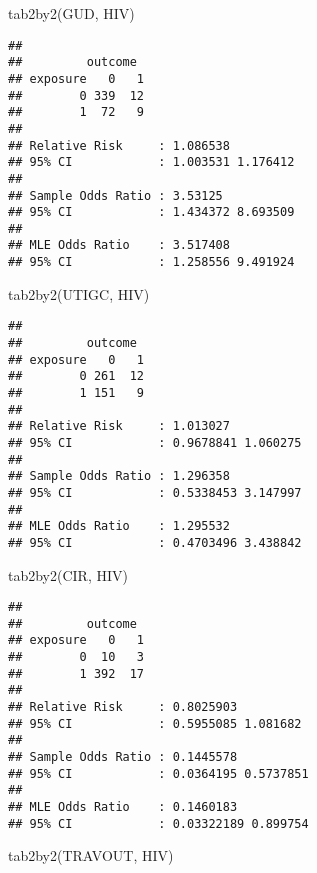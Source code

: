 \documentclass[
  12pt,
  a4paper]{book}
\newenvironment{Shaded}{\begin{snugshade}}{\end{snugshade}}
\newcommand{\FunctionTok}[1]{\textcolor[rgb]{0.00,0.00,0.00}{#1}}
\newcommand{\NormalTok}[1]{#1}
\begin{document}
\newpage

\begin{Shaded}
\begin{Highlighting}[]
\FunctionTok{tab2by2}\NormalTok{(GUD, HIV)}
\end{Highlighting}
\end{Shaded}

\begin{verbatim}
## 
##         outcome
## exposure   0   1
##        0 339  12
##        1  72   9
## 
## Relative Risk     : 1.086538 
## 95% CI            : 1.003531 1.176412 
## 
## Sample Odds Ratio : 3.53125 
## 95% CI            : 1.434372 8.693509 
## 
## MLE Odds Ratio    : 3.517408 
## 95% CI            : 1.258556 9.491924
\end{verbatim}

\begin{Shaded}
\begin{Highlighting}[]
\FunctionTok{tab2by2}\NormalTok{(UTIGC, HIV)}
\end{Highlighting}
\end{Shaded}

\begin{verbatim}
## 
##         outcome
## exposure   0   1
##        0 261  12
##        1 151   9
## 
## Relative Risk     : 1.013027 
## 95% CI            : 0.9678841 1.060275 
## 
## Sample Odds Ratio : 1.296358 
## 95% CI            : 0.5338453 3.147997 
## 
## MLE Odds Ratio    : 1.295532 
## 95% CI            : 0.4703496 3.438842
\end{verbatim}

\newpage

\begin{Shaded}
\begin{Highlighting}[]
\FunctionTok{tab2by2}\NormalTok{(CIR, HIV)}
\end{Highlighting}
\end{Shaded}

\begin{verbatim}
## 
##         outcome
## exposure   0   1
##        0  10   3
##        1 392  17
## 
## Relative Risk     : 0.8025903 
## 95% CI            : 0.5955085 1.081682 
## 
## Sample Odds Ratio : 0.1445578 
## 95% CI            : 0.0364195 0.5737851 
## 
## MLE Odds Ratio    : 0.1460183 
## 95% CI            : 0.03322189 0.899754
\end{verbatim}

\begin{Shaded}
\begin{Highlighting}[]
\FunctionTok{tab2by2}\NormalTok{(TRAVOUT, HIV)}
\end{Highlighting}
\end{Shaded}
\end{document}
